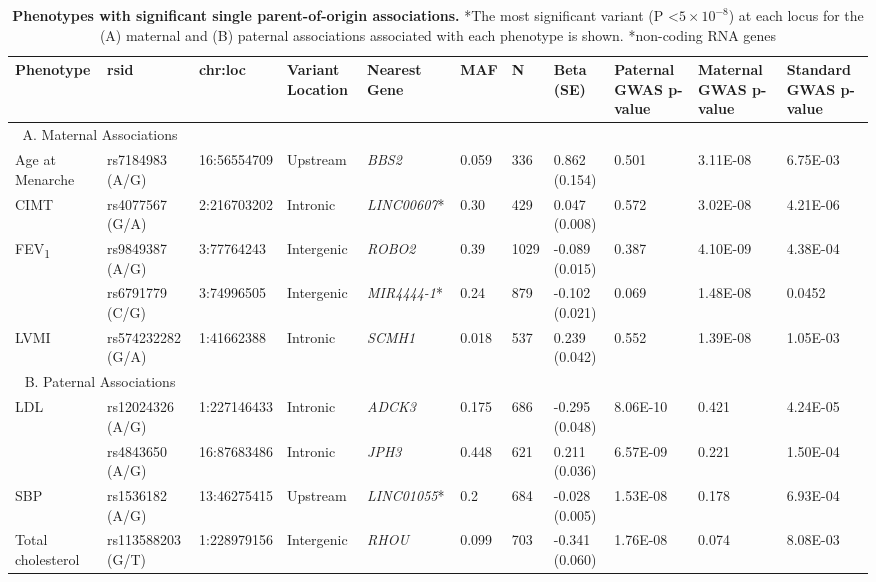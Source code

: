 \begin{table}
\centering
\begin{adjustbox}{width={\textwidth}}
\begin{tabular}{@{}p{3cm}|p{2cm}p{2cm}p{2cm}p{2.5cm}p{1cm}p{0.5cm}p{1.5cm}p{2cm}p{2cm}p{2cm}@{}}
\toprule Phenotype & rsid & chr:loc & Variant Location & Nearest Gene & MAF & N & Beta (SE) & Paternal GWAS p-value & Maternal GWAS p-value & Standard GWAS p-value \\ \midrule
 \multicolumn{2}{c}{A. Maternal Associations} &&&&&&&&& \\ \hline
Age at Menarche  & rs7184983 (A/G) & 16:56554709 & Upstream & \emph{BBS2} & 0.059 & 336 & 0.862 (0.154) & 0.501 & 3.11E-08 & 6.75E-03 \\ \hline
CIMT  & rs4077567 (G/A) & 2:216703202 & Intronic & \emph{LINC00607}* & 0.30	& 429 & 0.047 (0.008) & 0.572 & 3.02E-08 & 4.21E-06 \\  \hline
\multirow{2}{3cm}{FEV\textsubscript{1}} & rs9849387 (A/G)	& 3:77764243 & Intergenic & \emph{ROBO2} & 0.39 & 1029 & -0.089 (0.015) & 0.387 & 4.10E-09 & 4.38E-04 \\ \cline{2-11}
 & rs6791779 (C/G) & 3:74996505 & Intergenic & \emph{MIR4444-1}* & 0.24 & 879 & -0.102 (0.021) & 0.069 & 1.48E-08 & 0.0452\\ \hline
LVMI & rs574232282 (G/A) & 1:41662388 & Intronic & \emph{SCMH1} & 0.018 & 537 & 0.239 (0.042) & 0.552 & 1.39E-08 & 1.05E-03\\ \hline
\multicolumn{2}{c}{B. Paternal Associations} &&&&&&&&&\\  \hline
\multirow{2}{3cm}{LDL} & rs12024326 (A/G) & 1:227146433 & Intronic & \emph{ADCK3} & 0.175 & 686 & -0.295 (0.048) & 8.06E-10 & 0.421 & 4.24E-05\\ \cline{2-11}
 & rs4843650 (A/G) & 16:87683486 & Intronic & \emph{JPH3} & 0.448 & 621 & 0.211 (0.036) & 6.57E-09 & 0.221 & 1.50E-04\\ \hline
SBP & rs1536182 (A/G) & 13:46275415 & Upstream & \emph{LINC01055}* & 0.2 & 684 & -0.028 (0.005)	& 1.53E-08 & 0.178 & 6.93E-04\\ \hline
Total cholesterol & rs113588203 (G/T) & 1:228979156 & Intergenic & \emph{RHOU} & 0.099 & 703 & -0.341 (0.060) & 1.76E-08 & 0.074 & 8.08E-03\\ \bottomrule
\end{tabular}
\end{adjustbox}
\caption[Phenotypes with significant single parent-of-origin associations. ]{\textbf{Phenotypes with significant single parent-of-origin associations.}
 *The most significant variant (P \textless $5 \times 10^{-8} $) at each locus for the (A) maternal and (B) paternal associations associated with each phenotype is shown. 
*non-coding RNA genes}
\label{tab:singleparent}
\end{table}


